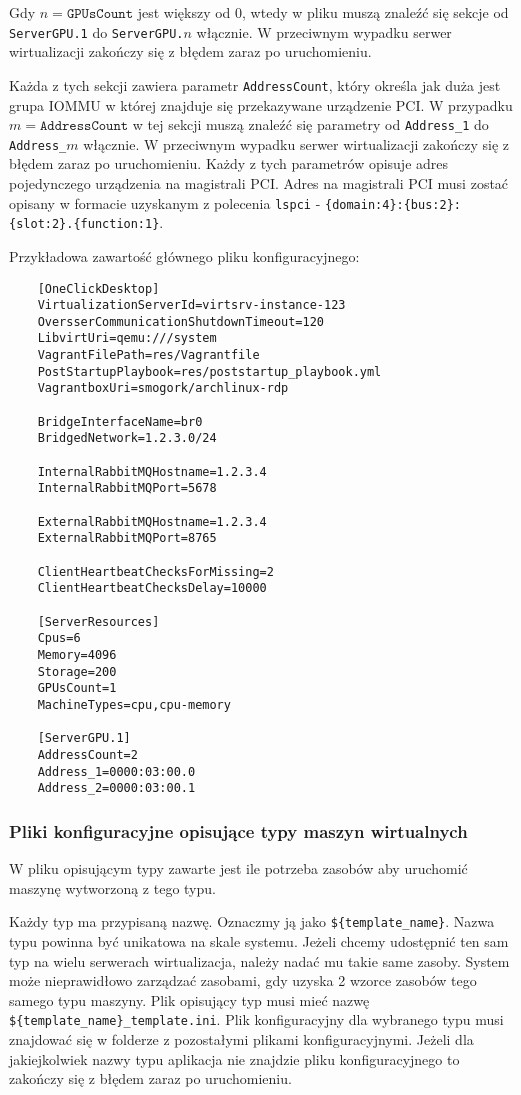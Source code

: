 \documentclass[../opis-rozwiazania.tex]{subfiles}
\begin{document}
Gdy $n = \texttt{GPUsCount}$ jest większy od 0, wtedy w pliku muszą znaleźć się sekcje od \texttt{ServerGPU.1} do \texttt{ServerGPU.$n$} włącznie.
W przeciwnym wypadku serwer wirtualizacji zakończy się z błędem zaraz po uruchomieniu.

Każda z tych sekcji zawiera parametr \texttt{AddressCount}, który określa jak duża jest grupa IOMMU w której znajduje się przekazywane urządzenie PCI.
W przypadku $m = \texttt{AddressCount}$ w tej sekcji muszą znaleźć się parametry od \texttt{Address\_1} do \texttt{Address\_$m$} włącznie.
W przeciwnym wypadku serwer wirtualizacji zakończy się z błędem zaraz po uruchomieniu.
Każdy z tych parametrów opisuje adres pojedynczego urządzenia na magistrali PCI.
Adres na magistrali PCI musi zostać opisany w formacie uzyskanym z polecenia \texttt{lspci} - \texttt{\{domain:4\}:\{bus:2\}:\{slot:2\}.\{function:1\}}.

Przykładowa zawartość głównego pliku konfiguracyjnego:
\begin{verbatim}
	[OneClickDesktop]
	VirtualizationServerId=virtsrv-instance-123
	OversserCommunicationShutdownTimeout=120
	LibvirtUri=qemu:///system
	VagrantFilePath=res/Vagrantfile
	PostStartupPlaybook=res/poststartup_playbook.yml
	VagrantboxUri=smogork/archlinux-rdp

	BridgeInterfaceName=br0
	BridgedNetwork=1.2.3.0/24

	InternalRabbitMQHostname=1.2.3.4
	InternalRabbitMQPort=5678

	ExternalRabbitMQHostname=1.2.3.4
	ExternalRabbitMQPort=8765

	ClientHeartbeatChecksForMissing=2
	ClientHeartbeatChecksDelay=10000

	[ServerResources]
	Cpus=6
	Memory=4096
	Storage=200
	GPUsCount=1
	MachineTypes=cpu,cpu-memory

	[ServerGPU.1]
	AddressCount=2
	Address_1=0000:03:00.0
	Address_2=0000:03:00.1
\end{verbatim}

\subsubsection{Pliki konfiguracyjne opisujące typy maszyn wirtualnych}
W pliku opisującym typy zawarte jest ile potrzeba zasobów aby uruchomić maszynę wytworzoną z tego typu.

Każdy typ ma przypisaną nazwę. Oznaczmy ją jako \texttt{\$\{template\_name\}}.
Nazwa typu powinna być unikatowa na skale systemu.
Jeżeli chcemy udostępnić ten sam typ na wielu serwerach wirtualizacja, należy nadać mu takie same zasoby.
System może nieprawidłowo zarządzać zasobami, gdy uzyska 2 wzorce zasobów tego samego typu maszyny.
Plik opisujący typ musi mieć nazwę \texttt{\$\{template\_name\}\_template.ini}.
Plik konfiguracyjny dla wybranego typu musi znajdować się w folderze z pozostałymi plikami konfiguracyjnymi.
Jeżeli dla jakiejkolwiek nazwy typu aplikacja nie znajdzie pliku konfiguracyjnego to zakończy się z błędem zaraz po uruchomieniu.
\end{document}
